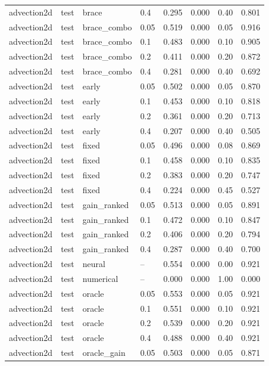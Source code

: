 \begin{longtable}{llllrrrr}
advection2d & test & brace & 0.4 & 0.295 & 0.000 & 0.40 & 0.801 \\
advection2d & test & brace\_combo & 0.05 & 0.519 & 0.000 & 0.05 & 0.916 \\
advection2d & test & brace\_combo & 0.1 & 0.483 & 0.000 & 0.10 & 0.905 \\
advection2d & test & brace\_combo & 0.2 & 0.411 & 0.000 & 0.20 & 0.872 \\
advection2d & test & brace\_combo & 0.4 & 0.281 & 0.000 & 0.40 & 0.692 \\
advection2d & test & early & 0.05 & 0.502 & 0.000 & 0.05 & 0.870 \\
advection2d & test & early & 0.1 & 0.453 & 0.000 & 0.10 & 0.818 \\
advection2d & test & early & 0.2 & 0.361 & 0.000 & 0.20 & 0.713 \\
advection2d & test & early & 0.4 & 0.207 & 0.000 & 0.40 & 0.505 \\
advection2d & test & fixed & 0.05 & 0.496 & 0.000 & 0.08 & 0.869 \\
advection2d & test & fixed & 0.1 & 0.458 & 0.000 & 0.10 & 0.835 \\
advection2d & test & fixed & 0.2 & 0.383 & 0.000 & 0.20 & 0.747 \\
advection2d & test & fixed & 0.4 & 0.224 & 0.000 & 0.45 & 0.527 \\
advection2d & test & gain\_ranked & 0.05 & 0.513 & 0.000 & 0.05 & 0.891 \\
advection2d & test & gain\_ranked & 0.1 & 0.472 & 0.000 & 0.10 & 0.847 \\
advection2d & test & gain\_ranked & 0.2 & 0.406 & 0.000 & 0.20 & 0.794 \\
advection2d & test & gain\_ranked & 0.4 & 0.287 & 0.000 & 0.40 & 0.700 \\
advection2d & test & neural & -- & 0.554 & 0.000 & 0.00 & 0.921 \\
advection2d & test & numerical & -- & 0.000 & 0.000 & 1.00 & 0.000 \\
advection2d & test & oracle & 0.05 & 0.553 & 0.000 & 0.05 & 0.921 \\
advection2d & test & oracle & 0.1 & 0.551 & 0.000 & 0.10 & 0.921 \\
advection2d & test & oracle & 0.2 & 0.539 & 0.000 & 0.20 & 0.921 \\
advection2d & test & oracle & 0.4 & 0.488 & 0.000 & 0.40 & 0.921 \\
advection2d & test & oracle\_gain & 0.05 & 0.503 & 0.000 & 0.05 & 0.871 \\

\end{longtable}
